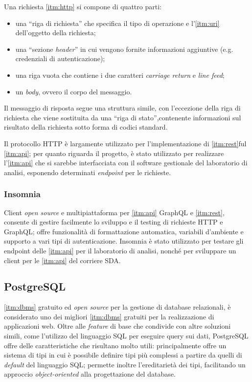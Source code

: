 Una richiesta \ref{itm:http} si compone di quattro parti:
\begin{itemize}
    \item una ``riga di richiesta'' che specifica il tipo di operazione e l'\ref{itm:uri} dell'oggetto della richiesta;
    \item una ``sezione \textit{header}'' in cui vengono fornite informazioni aggiuntive (e.g. credenziali di autenticazione);
    \item una riga vuota che contiene i due caratteri \textit{carriage return} e \textit{line feed};
    \item un \textit{body}, ovvero il corpo del messaggio.
\end{itemize}

Il messaggio di risposta segue una struttura simile, con l'eccezione della riga di richiesta che viene sostituita da una ``riga di stato'',contenente informazioni sul risultato della richiesta sotto forma di codici standard.

Il protocollo HTTP è largamente utilizzato per l'implementazione di \ref{itm:rest}ful \ref{itm:api}; per quanto riguarda il progetto, è stato utilizzato per realizzare l'\ref{itm:api} che si sarebbe interfacciata con il software gestionale del laboratorio di analisi, esponendo determinati \textit{endpoint} per le richieste.

\subsubsection{Insomnia}
Client \textit{open source} e multipiattaforma per \ref{itm:api} GraphQL e \ref{itm:rest}, consente di gestire facilmente lo sviluppo e il testing di richieste HTTP e GraphQL; offre funzionalità di formattazione automatica, variabili d'ambiente e supporto a vari tipi di autenticazione. Insomnia è stato utilizzato per testare gli endpoint delle \ref{itm:api} per il laboratorio di analisi, nonché per sviluppare un client per le \ref{itm:api} del corriere SDA.

\subsection{PostgreSQL}
\ref{itm:dbms} gratuito ed \textit{open source} per la gestione di database relazionali, è considerato uno dei migliori \ref{itm:dbms} gratuiti per la realizzazione di applicazioni web. Oltre alle \textit{feature} di base che condivide con altre soluzioni simili, come l'utilizzo del linguaggio SQL per eseguire query sui dati, PostgreSQL offre delle caratteristiche che risultano molto utili: principalmente offre un sistema di tipi in cui è possibile definire tipi più complessi a partire da quelli di \textit{default} del linguaggio SQL;  permette inoltre l'ereditarietà dei tipi, facilitando un approccio \textit{object-oriented} alla progettazione del database.

